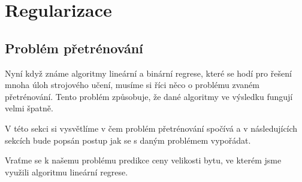











\section{Regularizace}
\label{sec:Regularizace}
















\subsection{Problém přetrénování}
\label{sec:RegularizaceProblemPretrenovani}

\par{Nyní když známe algoritmy lineární a binární regrese, které se hodí pro řešení mnoha úloh strojového učení, musíme si říci něco o problému zvaném přetrénování. Tento problém způsobuje, že dané algoritmy ve výsledku fungují velmi špatně.}

\par{V této sekci si vysvětlíme v čem problém přetrénování spočívá a v následujících sekcích bude popsán postup jak se s daným problémem vypořádat.}

\par{Vraťme se k našemu problému predikce ceny velikosti bytu, ve kterém jsme využili algoritmu lineární regrese.}

